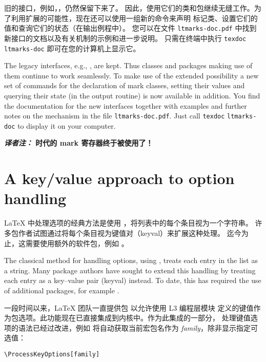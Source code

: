 \documentclass{ltnews}
\providecommand\eTeX{\hologo{eTeX}}
\newcommand*\thbox{\texorpdfstring\hbox{}}
\def\LATEX{\LaTeX}
\newcommand{\transnote}[1]{\par{\bfseries \textit{译者注：}#1}\par}
\begin{document}
旧的接口，例如，，仍然保留下来了。
因此，使用它们的类和包继续无缝工作。为了利用扩展的可能性，现在还可以使用一组新的命令来声明
标记类、设置它们的值和查询它们的状态（在输出例程中）。
您可以在文件 \texttt{ltmarks-doc.pdf} 中找到新接口的文档以及有关机制的示例和进一步说明。
只需在终端中执行 \texttt{texdoc} \texttt{ltmarks-doc} 即可在您的计算机上显示它。

\begin{english}
The legacy interfaces, e.g., , are kept. Thus classes and
packages making use of them continue to work seamlessly. To make use
of the extended possibility a new set of commands for the declaration of
mark classes, setting their values and querying their state (in the
output routine) is now available in addition.
%
You find the documentation for the new interfaces together with
examples and further notes on the mechanism in the file
\texttt{ltmarks-doc.pdf}. Just call \texttt{texdoc}
\texttt{ltmarks-doc} to display it on your computer.
\end{english}

\transnote{\eTeX{} 时代的 mark 寄存器终于被使用了！}


\section{\thbox{键值选项} A key/value approach to option handling}

\LaTeX{} 中处理选项的经典方法是使用 ，将列表中的每个条目视为一个字符串。
许多包作者试图通过将每个条目视为键值对（keyval）来扩展这种处理。
迄今为止，这需要使用额外的软件包，例如 。

\begin{english}
The classical \LaTeXe{} method for handling options, using ,
treats each entry in the list as a string. Many package authors have sought to
extend this handling by treating each entry as a key--value pair (keyval)
instead. To date, this has required the use of additional packages, for example
.
\end{english}

一段时间以来，\LATEX{} 团队一直提供包  以允许使用 L3 编程层模块  
定义的键值作为包选项。此功能现在已直接集成到内核中。作为此集成的一部分，
处理键值选项的语法已经过改进，例如  将自动获取当前宏包名作为
\emph{family}，除非显示指定可选值：
\begin{verbatim}
\ProcessKeyOptions[family]
\end{verbatim}
\end{document}
